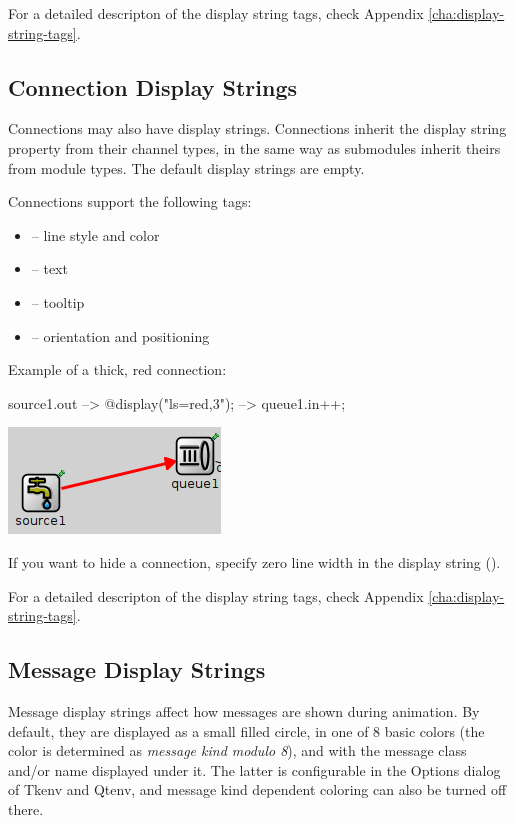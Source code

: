 For a detailed descripton of the display string tags, check
Appendix \ref{cha:display-string-tags}.

\subsection{Connection Display Strings}

Connections may also have display strings. Connections inherit the
display string property from their channel types, in the same way as
submodules inherit theirs from module types. The default display
strings are empty.

Connections support the following tags:
\begin{itemize}
  \item{ -- line style and color}
  \item{ -- text}
  \item{ -- tooltip}
  \item{ -- orientation and positioning}
\end{itemize}

Example of a thick, red connection:
\begin{ned}
source1.out --> { @display("ls=red,3"); } --> queue1.in++;
\end{ned}

\begin{center}
\includegraphics{figures/graphics-lstag}
\end{center}

\begin{note}
If you want to hide a connection, specify zero line width in the display
string ().
\end{note}

For a detailed descripton of the display string tags, check
Appendix \ref{cha:display-string-tags}.

\subsection{Message Display Strings}

Message display strings affect how messages are shown during animation.
By default, they are displayed as a small filled circle, in one of
8 basic colors (the color is determined as \textit{message kind modulo 8}),
and with the message class and/or name displayed under it.
The latter is configurable in the Options dialog of Tkenv and Qtenv,
and message kind dependent coloring can also be turned off there.

